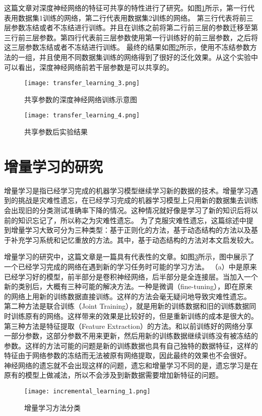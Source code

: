这篇文章\cite{yosinski_2014_NIPS}对深度神经网络的特征可共享的特性进行了研究。如图\ref{fig:transfer_learning_3}所示，第一行代表用数据集1训练的网络，第二行代表用数据集2训练的网络。
第三行代表将前三层参数冻结或者不冻结进行训练。并且在训练之前将第二行前三层的参数迁移至第三行前三层参数。第四行代表前三层参数使用第一行训练好的前三层参数，之后将这三层参数冻结或者不冻结进行训练。
最终的结果如图\ref{fig:transfer_learning_4}所示，使用不冻结参数方法的一组，并且使用不同数据集训练的网络得到了很好的泛化效果。从这个实验中可以看出，深度神经网络前若干层参数是可以共享的。
\begin{figure}
    \centering
    \texttt{[image: transfer\_learning\_3.png]}
    \caption{共享参数的深度神经网络训练示意图\cite{yosinski_2014_NIPS}}
    \label{fig:transfer_learning_3}
\end{figure}
\begin{figure}
    \centering
    \texttt{[image: transfer\_learning\_4.png]}
    \caption{共享参数后实验结果\cite{yosinski_2014_NIPS}}
    \label{fig:transfer_learning_4}
\end{figure}

\section{增量学习的研究}
增量学习是指已经学习完成的机器学习模型继续学习新的数据的技术。增量学习遇到的挑战是灾难性遗忘，在已经学习完成的机器学习模型上只用新的数据集去训练会出现旧的分类测试准确率下降的情况。这种情况就好像是学习了新的知识后将以前的知识忘记了，所以称之为灾难性遗忘。
为了克服灾难性遗忘，这篇综述\cite{PARISI201954}中提到增量学习大致可分为三种类型：基于正则化的方法，基于动态结构的方法以及基于补充学习系统和记忆重放的方法。其中，基于动态结构的方法对本文启发较大。

增量学习的研究中，这篇文章\cite{8107520}是一篇具有代表性的文章。如图\ref{fig:incremental_learning_1}所示，图中展示了一个已经学习完成的网络在遇到新的学习任务时可能的学习方法。
（a）中是原来已经学习好的模型，前半部分是卷积神经网络，后半部分是全连接层。当加入一个新的类别后，大概有三种可能的解决方法。一种是微调（fine-tuning），即在原来的网络上用新的训练数据直接训练。这样的方法会毫无疑问地导致灾难性遗忘。
第二种方法是联合训练（Joint Training），就是用新的训练数据和旧的训练数据同时训练原有的网络。这样带来的效果是比较好的，但是重新训练的成本是很大的。
第三种方法是特征提取（Feature Extraction）的方法。和以前训练好的网络分享一部分参数，这部分参数不用来更新，然后用新的训练数据继续训练没有被冻结的参数。这样的方法可能的问题是新的训练数据也具有自己独特的数据特征，这样的特征由于网络参数的冻结而无法被原有网络提取，因此最终的效果也不会很好。
神经网络的遗忘就不会出现这样的问题，遗忘和增量学习不同的是，遗忘学习是在原有的模型上做减法，所以不会涉及到新数据需要增加新特征的问题。
\begin{figure}
    \centering
    \texttt{[image: incremental\_learning\_1.png]}
    \caption{增量学习方法分类\cite{8107520}}
    \label{fig:incremental_learning_1}
\end{figure}

